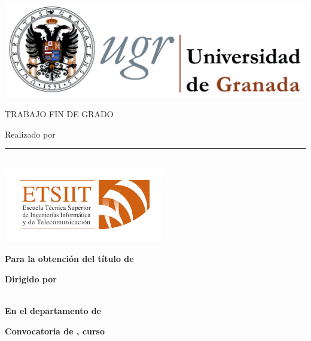 \thispagestyle{empty} %
\begin{center}

\includegraphics[width=\textwidth]{figures/ugr2.png}

\vspace*{1cm}
\begin{large}
TRABAJO FIN DE GRADO
\end{large}

\vspace*{0.5cm}
\textbf{\LARGE \tfgTitle} 
\vspace*{0.5cm}

{\large Realizado por}\\
\textbf{\Large \tfgAuthors}

\vspace*{.1in}

\noindent\rule[-1ex]{\textwidth}{3pt}\\[3.5ex]

\includegraphics[width=7cm]{figures/etsiit-horizontal-color-bi.png}

\textbf{Para la obtención del título de}\\
{\large \tfgDegree}

\vspace*{0.2in}

\textbf{Dirigido por}\\
{\large \tfgSupervisor}\\

\vspace*{0.3in}

\textbf{En el departamento de}\\ 
{\large \tfgDepartment}

\vspace*{.2in}
\textbf{\Large Convocatoria de \tfgMonth, curso \tfgYear}

\end{center}

\ifdefined\tfgDedication
    \newpage
    \thispagestyle{empty}
    
    \vspace*{\fill}
    \begin{center}
    \textit{\tfgDedication}
    \end{center}
    \vspace*{\fill}
\fi

\clearpage\setcounter{page}{1} %
